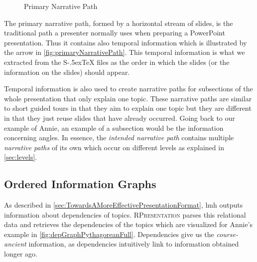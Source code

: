 \documentclass{llncs}
\def\stex{\texorpdfstring{\raisebox{-.5ex}S\kern-.5ex\TeX}{sTeX}\xspace}
\newcommand{\sys}{\textsc{RPresentation}\xspace}
\begin{document}
\begin{figure}
\vspace{-30pt}
  \begin{center}
  \end{center}
\vspace{-20pt}
  \caption{Primary Narrative Path}
  \label{fig:primaryNarrativePath}
\vspace{12pt}
\end{figure}

\begin{figure}
\vspace{-50pt}
\end{figure}

The primary narrative path, formed by a horizontal stream of slides, is the traditional path a presenter normally uses when preparing a PowerPoint presentation. Thus it contains also temporal information which is illustrated by the arrow in \autoref{fig:primaryNarrativePath}. This temporal information is what we extracted from the \stex files as the order in which the slides (or the information on the slides) should appear.

Temporal information is also used to create narrative paths for subsections of the whole presentation that only explain one topic. These narrative paths are similar to short guided tours in that they aim to explain one topic but they are different in that they just reuse slides that have already occurred. Going back to our example of Annie, an example of a subsection would be the information concerning angles. In essence, the \textit{intended narrative path} contains multiple \textit{narrative paths} of its own which occur on different levels as explained in \autoref{sec:levels}.

\subsection{Ordered Information Graphs}
\label{sec:orderedInfoGraphs}

As described in \autoref{sec:TowardsAMoreEffectivePresentationFormat}, lmh outputs information about dependencies of topics. \sys parses this relational data and retrieves the dependencies of the topics which are visualized for Annie's example in \autoref{fig:depGraphPythagoreanFull}. Dependencies give us the \textit{course-ancient} information, as dependencies intuitively link to information obtained longer ago.
\end{document}
